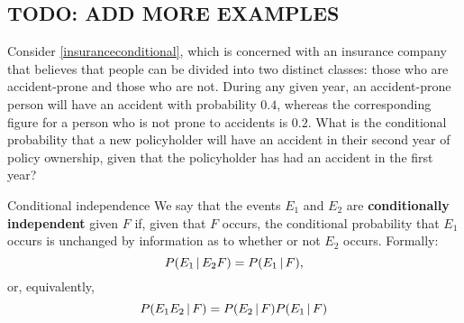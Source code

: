 \subsection{TODO: ADD MORE EXAMPLES}
\begin{changebar}
    \begin{example}
        Consider \autoref{insuranceconditional}, which is concerned with an insurance company that believes that people can be divided into two distinct classes: those who are accident-prone and those who are not. During any given year, an accident-prone person will have an accident with probability $0.4$, whereas the corresponding figure for a person who is not prone to accidents is $0.2$. What is the conditional probability that a new policyholder will have an accident in their second year of policy ownership, given that the policyholder has had an accident in the first year?
    \end{example}
    \begin{solution}
        
    \end{solution}
\end{changebar}
\begin{bdef}{Conditional independence}\label{conditionalindependence}
    We say that the events $E_1$ and $E_2$ are \textbf{conditionally independent} given $F$ if, given that $F$ occurs, the conditional probability that $E_1$ occurs is unchanged by information as to whether or not $E_2$ occurs. Formally: \[
        P(E_1 \,\vert\, E_2F) = P(E_1 \,\vert\, F),    
    \] or, equivalently, \[
        P(E_1E_2 \,\vert\, F) = P(E_2 \,\vert\, F)P(E_1 \,\vert\, F)    
    \]
\end{bdef}
